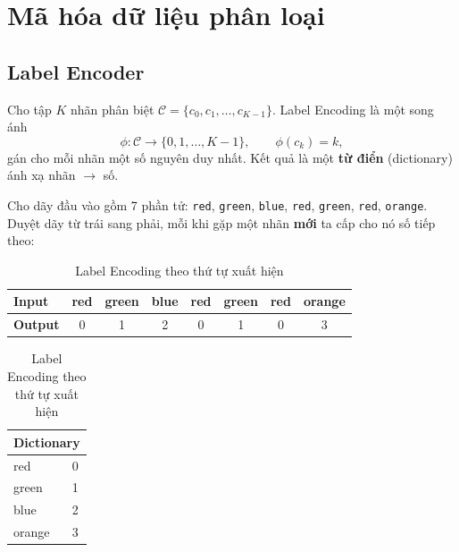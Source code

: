 \section{Mã hóa dữ liệu phân loại}

\subsection{Label Encoder}

\begin{definition}
Cho tập $K$ nhãn phân biệt $\mathcal{C} = \{c_0, c_1, \dots, c_{K-1}\}$. Label Encoding là một song ánh
\begin{equation}
    \phi : \mathcal{C} \rightarrow \{0, 1, \dots, K-1\}, \qquad \phi(c_k) = k,
\end{equation}
gán cho mỗi nhãn một số nguyên duy nhất. Kết quả là một \textbf{từ điển} (dictionary) ánh xạ nhãn $\rightarrow$ số.
\end{definition}

\begin{example}
Cho dãy đầu vào gồm 7 phần tử: \texttt{red}, \texttt{green}, \texttt{blue}, \texttt{red}, \texttt{green}, \texttt{red}, \texttt{orange}. Duyệt dãy từ trái sang phải, mỗi khi gặp một nhãn \textbf{mới} ta cấp cho nó số tiếp theo:
\end{example}

\begin{table}[H]
\centering
\begin{tabular}{|l|c|c|c|c|c|c|c|}
\hline
\textbf{Input}  & red & green & blue & red & green & red & orange \\
\hline
\textbf{Output} & 0 & 1 & 2 & 0 & 1 & 0 & 3 \\
\hline
\end{tabular}
\quad
\begin{tabular}{|l|c|}
\hline
\multicolumn{2}{|c|}{\textbf{Dictionary}} \\
\hline
red & 0 \\ green & 1 \\ blue & 2 \\ orange & 3 \\
\hline
\end{tabular}
\caption{Label Encoding theo thứ tự xuất hiện}
\label{tab:labelenc}
\end{table}



